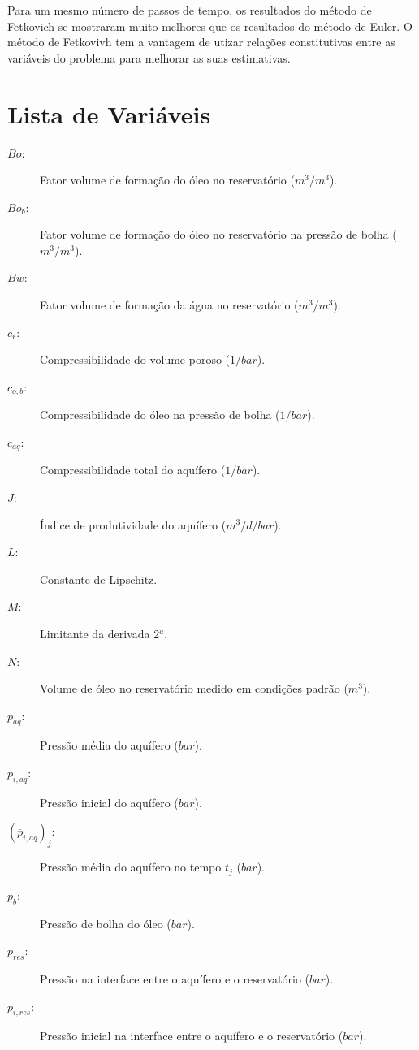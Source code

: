 \documentclass[final,5p]{elsarticle}
\numberwithin{equation}{section}
\begin{document}
        Para um mesmo número de passos de tempo, os resultados do método de Fetkovich se mostraram muito melhores que os resultados do método de Euler. O método de Fetkovivh tem a vantagem de utizar relações constitutivas entre as variáveis do problema para melhorar as suas estimativas.



\appendix

\section{Lista de Variáveis}

\begin{description}
    \item[$Bo$:]Fator volume de formação do óleo no reservatório ($m^3/m^3$).
    \item[$Bo_b$:]Fator volume de formação do óleo no reservatório na pressão de bolha ($m^3/m^3$).
    \item[$Bw$:]Fator volume de formação da água no reservatório ($m^3/m^3$).
    \item[$c_r$:]Compressibilidade do volume poroso ($1/bar$).
    \item[$c_{o,b}$:]Compressibilidade do óleo na pressão de bolha ($1/bar$).
    \item[$c_{aq}$:]Compressibilidade total do aquífero ($1/bar$).
    \item[$J$:]Índice de produtividade do aquífero ($m^3/d/bar$).
    \item[$L$:]Constante de Lipschitz.
    \item[$M$:]Limitante da derivada 2$^a$.
    \item[$N$:]Volume de óleo no reservatório medido em condições padrão ($m^3$).
    \item[$p_{aq}$:]Pressão média do aquífero ($bar$).
    \item[$p_{i,aq}$:]Pressão inicial do aquífero ($bar$).
    \item[$(\overline{p}_{i,aq})_j$:]Pressão média do aquífero no tempo $t_j$ ($bar$).
    \item[$p_b$:]Pressão de bolha do óleo ($bar$).
    \item[$p_{res}$:]Pressão na interface entre o aquífero e o reservatório ($bar$).
    \item[$p_{i,res}$:]Pressão inicial na interface entre o aquífero e o reservatório ($bar$).

\end{description}
\end{document}
